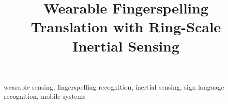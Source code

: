 \documentclass[10pt,conference,letterpaper]{IEEEtran}
\begin{document}
\title{Wearable Fingerspelling Translation with Ring-Scale Inertial Sensing}

\author{}

\maketitle



\begin{IEEEkeywords}
wearable sensing, fingerspelling recognition, inertial sensing, sign language recognition, mobile systems
\end{IEEEkeywords}












% 
% 
\end{document}
